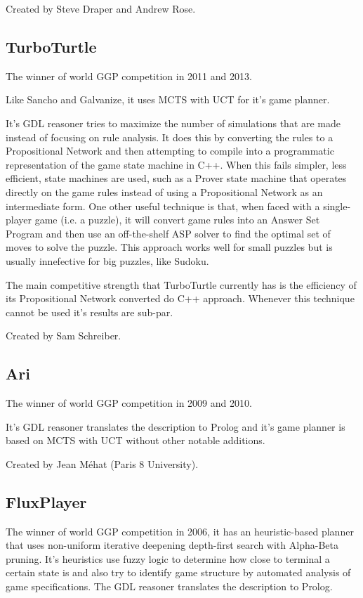 Created by Steve Draper and Andrew Rose.

\subsection{TurboTurtle}
The winner of world GGP competition in 2011 and 2013.

Like Sancho and Galvanize, it uses \gls{MCTS} with \gls{UCT} for it's game planner.

It's GDL reasoner tries to maximize the number of simulations that are made instead of focusing on rule analysis. It does this by converting the rules to a Propositional Network and then attempting to compile into a programmatic representation of the game state machine in C++. When this fails simpler, less efficient, state machines are used, such as a Prover state machine that operates directly on the game rules instead of using a Propositional Network as an intermediate form.
One other useful technique is that, when faced with a single-player game (i.e. a puzzle), it will convert game rules into an Answer Set Program and then use an off-the-shelf ASP solver to find the optimal set of moves to solve the puzzle. This approach works well for small puzzles but is usually innefective for big puzzles, like Sudoku.

The main competitive strength that TurboTurtle currently has is the efficiency of its Propositional Network converted do C++ approach. Whenever this technique cannot be used it's results are sub-par. 

Created by Sam Schreiber.

\subsection{Ari}
The winner of world GGP competition in 2009 and 2010.

It's GDL reasoner translates the description to Prolog and it's game planner is based on \gls{MCTS} with \gls{UCT} without other notable additions.

Created by Jean Méhat (Paris 8 University).


\subsection{FluxPlayer}

The winner of world GGP competition in 2006, it has an heuristic-based planner that uses non-uniform iterative deepening depth-first search with Alpha-Beta pruning. It's heuristics use fuzzy logic to determine how close to terminal a certain state is and also try to identify game structure by automated analysis of game specifications.
The GDL reasoner translates the description to Prolog.

